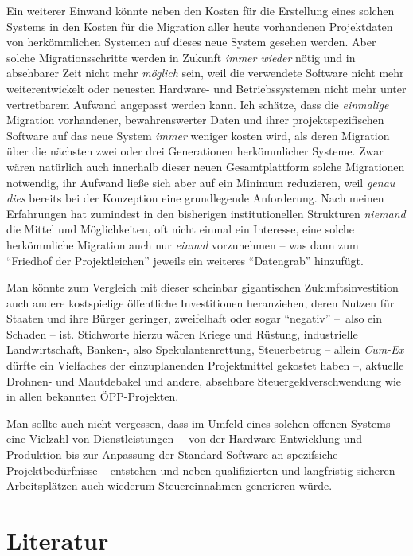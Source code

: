 \documentclass[a4paper,
fontsize=11pt,
oneside,
numbers=noperiodatend,
parskip=half-,
bibliography=totoc,
final
]{scrartcl}
\begin{document}
Ein weiterer Einwand könnte neben den Kosten für die Erstellung eines
solchen Systems in den Kosten für die Migration aller heute vorhandenen
Projektdaten von herkömmlichen Systemen auf dieses neue System gesehen
werden. Aber solche Migrationsschritte werden in Zukunft \emph{immer
wieder} nötig und in absehbarer Zeit nicht mehr \emph{möglich} sein,
weil die verwendete Software nicht mehr weiterentwickelt oder neuesten
Hardware- und Betriebssystemen nicht mehr unter vertretbarem Aufwand
angepasst werden kann. Ich schätze, dass die \emph{einmalige} Migration
vorhandener, bewahrenswerter Daten und ihrer projektspezifischen
Software auf das neue System \emph{immer} weniger kosten wird, als deren
Migration über die nächsten zwei oder drei Generationen herkömmlicher
Systeme. Zwar wären natürlich auch innerhalb dieser neuen
Gesamtplattform solche Migrationen notwendig, ihr Aufwand ließe sich
aber auf ein Minimum reduzieren, weil \emph{genau dies} bereits bei der
Konzeption eine grundlegende Anforderung. Nach meinen Erfahrungen hat
zumindest in den bisherigen institutionellen Strukturen \emph{niemand}
die Mittel und Möglichkeiten, oft nicht einmal ein Interesse, eine
solche herkömmliche Migration auch nur \emph{einmal} vorzunehmen -- was
dann zum \enquote{Friedhof der Projektleichen} jeweils ein weiteres
\enquote{Datengrab} hinzufügt.

Man könnte zum Vergleich mit dieser scheinbar gigantischen
Zukunftsinvestition auch andere kostspielige öffentliche Investitionen
heranziehen, deren Nutzen für Staaten und ihre Bürger geringer,
zweifelhaft oder sogar \enquote{negativ} --~also ein Schaden -- ist.
Stichworte hierzu wären Kriege und Rüstung, industrielle Landwirtschaft,
Banken-, also Spekulantenrettung, Steuerbetrug -- allein \emph{Cum-Ex}
dürfte ein Vielfaches der einzuplanenden Projektmittel gekostet haben
--, aktuelle Drohnen- und Mautdebakel und andere, absehbare
Steuergeldverschwendung wie in allen bekannten ÖPP-Projekten.

Man sollte auch nicht vergessen, dass im Umfeld eines solchen offenen
Systems eine Vielzahl von Dienstleistungen --~von der
Hardware-Entwicklung und Produktion bis zur Anpassung der
Standard-Software an spezifsiche Projektbedürfnisse -- entstehen und
neben qualifizierten und langfristig sicheren Arbeitsplätzen auch
wiederum Steuereinnahmen generieren würde.

\hypertarget{literatur}{%
\section{Literatur}\label{literatur}}
\end{document}
